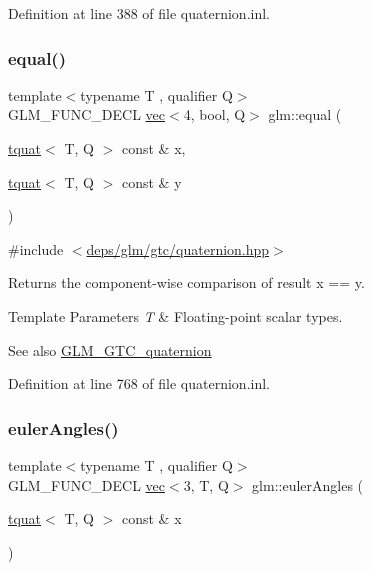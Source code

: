 Definition at line 388 of file quaternion.\+inl.

\mbox{\label{group__gtc__quaternion_ga22089a76bfb7b45b4c34961bb715e2df}} 
\subsubsection{\texorpdfstring{equal()}{equal()}}
{\footnotesize\ttfamily template$<$typename T , qualifier Q$>$ \\
G\+L\+M\+\_\+\+F\+U\+N\+C\+\_\+\+D\+E\+CL \hyperlink{structglm_1_1vec}{vec}$<$4, bool, Q$>$ glm\+::equal (\begin{DoxyParamCaption}\item[{\hyperlink{structglm_1_1tquat}{tquat}$<$ T, Q $>$ const \&}]{x,  }\item[{\hyperlink{structglm_1_1tquat}{tquat}$<$ T, Q $>$ const \&}]{y }\end{DoxyParamCaption})}



{\ttfamily \#include $<$\hyperlink{gtc_2quaternion_8hpp}{deps/glm/gtc/quaternion.\+hpp}$>$}

Returns the component-\/wise comparison of result x == y.


\begin{DoxyTemplParams}{Template Parameters}
{\em T} & Floating-\/point scalar types.\\
\hline
\end{DoxyTemplParams}
\begin{DoxySeeAlso}{See also}
\hyperlink{group__gtc__quaternion}{G\+L\+M\+\_\+\+G\+T\+C\+\_\+quaternion} 
\end{DoxySeeAlso}


Definition at line 768 of file quaternion.\+inl.

\mbox{\label{group__gtc__quaternion_gaf21424fa62e03de8b11c2b776c17d7a3}} 
\subsubsection{\texorpdfstring{euler\+Angles()}{eulerAngles()}}
{\footnotesize\ttfamily template$<$typename T , qualifier Q$>$ \\
G\+L\+M\+\_\+\+F\+U\+N\+C\+\_\+\+D\+E\+CL \hyperlink{structglm_1_1vec}{vec}$<$3, T, Q$>$ glm\+::euler\+Angles (\begin{DoxyParamCaption}\item[{\hyperlink{structglm_1_1tquat}{tquat}$<$ T, Q $>$ const \&}]{x }\end{DoxyParamCaption})}



